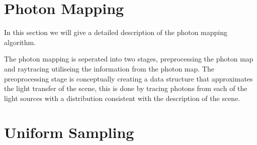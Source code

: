 
\section{Photon Mapping}
In this section we will give a detailed description of the photon mapping algorithm.

The photon mapping is seperated into two stages, preprocessing the photon map and raytracing utiliseing the information from the photon
map. The preoprocessing stage is conceptually creating a data structure that approximates the light transfer of the scene, this is done
by tracing photons from each of the light sources with a distribution consistent with the description of the scene.

\section{Uniform Sampling}
